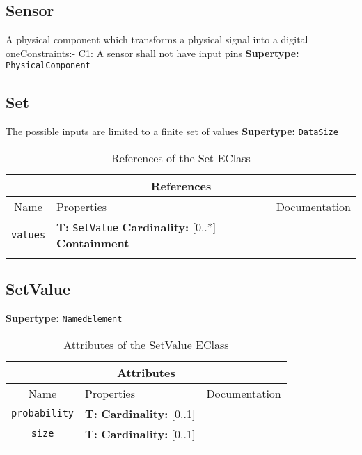 \documentclass{article}
\begin{document}
\subsection[Sensor]{Sensor}
\label{e4smSensor}

A physical component which transforms a physical signal into a digital oneConstraints:- C1: A sensor shall not have input pins
\textbf{Supertype: }\texttt{PhysicalComponent}
\subsection[Set]{Set}
\label{e4smSet}

The possible inputs are limited to a finite set of values
\textbf{Supertype: }\texttt{DataSize}
\begin{table}[H]
\footnotesize
\begin{tabularx}{\textwidth}{|c| p{4 cm} | X |}
\hline
\multicolumn{3}{|c|}{\textbf{References}} \\
\hline
Name & Properties & Documentation \\ \hline \hline
\texttt{values}
 & 
\textbf{T:} \texttt{SetValue}
\newline
\textbf{Cardinality:} [0..*]
\newline
\textbf{Containment}
 & \\ \hline
\caption{References of the Set EClass}
\end{tabularx}
\label{e4smSetref}
\end{table}
\subsection[SetValue]{SetValue}
\label{e4smSetValue}

\textbf{Supertype: }\texttt{NamedElement}
\begin{table}[H]
\footnotesize
\begin{tabularx}{\textwidth}{|c| p{4 cm} | X |}
\hline
\multicolumn{3}{|c|}{\textbf{Attributes}} \\
\hline
Name & Properties & Documentation \\ \hline \hline
\texttt{probability}
 & 
\textbf{T:} \texttt{}
\newline
\textbf{Cardinality:} [0..1]
 & \\ \hline
\texttt{size}
 & 
\textbf{T:} \texttt{}
\newline
\textbf{Cardinality:} [0..1]
 & \\ \hline
\caption{Attributes of the SetValue EClass}
\end{tabularx}
\label{e4smSetValueattr}
\end{table}
\end{document}
